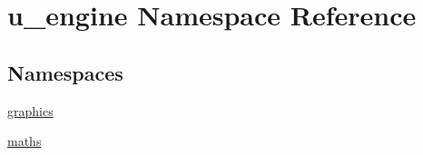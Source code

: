 \hypertarget{namespaceu__engine}{}\section{u\+\_\+engine Namespace Reference}
\label{namespaceu__engine}
\subsection*{Namespaces}
\begin{DoxyCompactItemize}
\item 
 \hyperlink{namespaceu__engine_1_1graphics}{graphics}
\item 
 \hyperlink{namespaceu__engine_1_1maths}{maths}
\end{DoxyCompactItemize}
